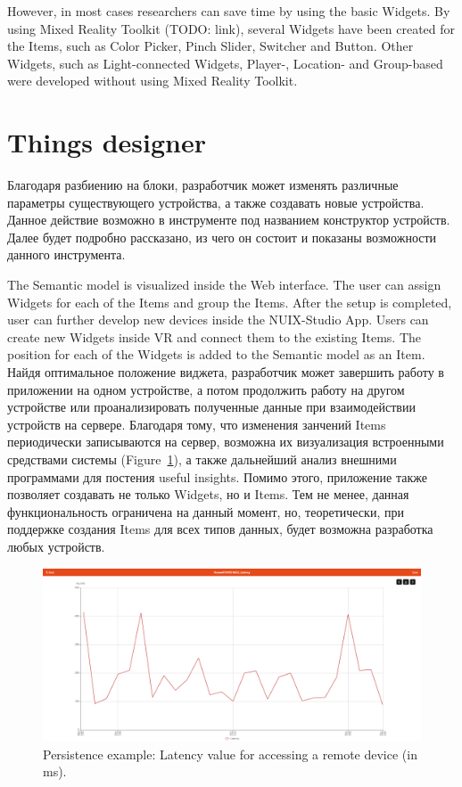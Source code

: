 However, in most cases researchers can save time by using the basic Widgets. By using Mixed Reality Toolkit (TODO: link), several Widgets have been created for the Items, such as Color Picker, Pinch Slider, Switcher and Button. Other Widgets, such as Light-connected Widgets, Player-, Location- and Group-based were developed without using Mixed Reality Toolkit.

\section{Things designer}

Благодаря разбиению на блоки, разработчик может изменять различные параметры существующего устройства, а также создавать новые устройства. Данное действие возможно в инструменте под названием конструктор устройств. Далее будет подробно рассказано, из чего он состоит и показаны возможности данного инструмента.

The Semantic model is visualized inside the Web interface. The user can assign Widgets for each of the Items and group the Items. After the setup is completed, user can further develop new devices inside the NUIX-Studio App. Users can create new Widgets inside VR and connect them to the existing Items. The position for each of the Widgets is added to the Semantic model as an Item. Найдя оптимальное положение виджета, разработчик может завершить работу в приложении на одном устройстве, а потом продолжить работу на другом устройстве или проанализировать полученные данные при взаимодействии устройств на сервере. Благодаря тому, что изменения занчений Items периодически записываются на сервер, возможна их визуализация встроенными средствами системы (Figure~\ref{fig:PersistenceExample-figure}), а также дальнейший анализ внешними программами для постения useful insights. Помимо этого, приложение также позволяет создавать не только Widgets, но и Items. Тем не менее, данная функциональность ограничена на данный момент, но, теоретически, при поддержке создания Items для всех типов данных, будет возможна разработка любых устройств.

\begin{figure}
  \centering
  \includegraphics[width=0.9\linewidth]{figures/PersistenceExample.png}
  \caption{Persistence example: Latency value for accessing a remote device (in ms). }
  \label{fig:PersistenceExample-figure}
\end{figure}

